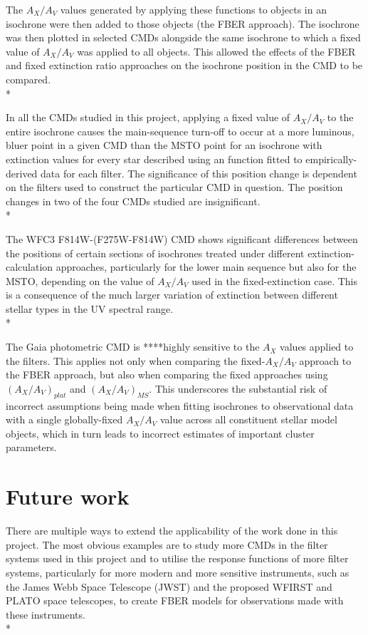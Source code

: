 \documentclass[12pt, a4paper]{report}
\begin{document}
The $A_{X}/A_{V}$ values generated by applying these functions to objects in an isochrone were then added to those objects (the FBER approach). The isochrone was then plotted in selected CMDs alongside the same isochrone to which a fixed value of $A_{X}/A_{V}$ was applied to all objects. This allowed the effects of the FBER and fixed extinction ratio approaches on the isochrone position in the CMD to be compared. \\*

In all the CMDs studied in this project, applying a fixed value of $A_{X}/A_{V}$ to the entire isochrone causes the main-sequence turn-off to occur at a more luminous, bluer point in a given CMD than the MSTO point for an isochrone with extinction values for every star described using an function fitted to empirically-derived data for each filter. The significance of this position change is dependent on the filters used to construct the particular CMD in question. The position changes in two of the four CMDs studied are insignificant.\\*

The WFC3 F814W-(F275W-F814W) CMD shows significant differences between the positions of certain sections of isochrones treated under different extinction-calculation approaches, particularly for the lower main sequence but also for the MSTO, depending on the value of $A_{X}/A_{V}$ used in the fixed-extinction case. This is a consequence of the much larger variation of extinction between different stellar types in the UV spectral range.\\*

The Gaia photometric CMD is ****highly sensitive to the $A_{X}$ values applied to the filters. This applies not only when comparing the fixed-$A_{X}/A_{V}$ approach to the FBER approach, but also when comparing the fixed approaches using $(A_{X}/A_{V})_{plat}$ and $(A_{X}/A_{V})_{MS}$. This underscores the substantial risk of incorrect assumptions being made when fitting isochrones to observational data with a single globally-fixed $A_{X}/A_{V}$ value across all constituent stellar model objects, which in turn leads to incorrect estimates of important cluster parameters.

\section{Future work}
There are multiple ways to extend the applicability of the work done in this project. The most obvious examples are to study more CMDs in the filter systems used in this project and to utilise the response functions of more filter systems, particularly for more modern and more sensitive instruments, such as the James Webb Space Telescope (JWST) and the proposed WFIRST and PLATO space telescopes, to create FBER models for observations made with these instruments.\\*
\end{document}

